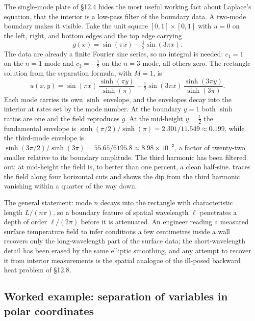 The single-mode plate of §12.4 hides the most useful working fact
about Laplace's equation, that the interior is a low-pass filter of
the boundary data. A two-mode boundary makes it visible. Take the
unit square $[0,1]\times[0,1]$ with $u = 0$ on the left, right, and
bottom edges and the top edge carrying
\[
g(x) = \sin(\pi x) - \tfrac{1}{2}\sin(3\pi x).
\]
The data are already a finite Fourier sine series, so no integral
is needed: $c_{1} = 1$ on the $n = 1$ mode and $c_{3} = -\tfrac{1}{2}$
on the $n = 3$ mode, all others zero. The rectangle solution from
the separation formula, with $M = 1$, is
\[
u(x, y) = \sin(\pi x)\, \frac{\sinh(\pi y)}{\sinh(\pi)}
        - \tfrac{1}{2}\sin(3\pi x)\, \frac{\sinh(3\pi y)}{\sinh(3\pi)}.
\]
Each mode carries its own $\sinh$ envelope, and the envelopes decay
into the interior at rates set by the mode number. At the boundary
$y = 1$ both $\sinh$ ratios are one and the field reproduces $g$. At
the mid-height $y = \tfrac{1}{2}$ the fundamental envelope is
$\sinh(\pi/2)/\sinh(\pi) = 2.301/11.549 \approx 0.199$, while the
third-mode envelope is $\sinh(3\pi/2)/\sinh(3\pi) = 55.65/6195.8
\approx 8.98 \times 10^{-3}$, a factor of twenty-two smaller
relative to its boundary amplitude. The third harmonic has been
filtered out: at mid-height the field is, to better than one
percent, a clean half-sine. 
traces the field along four horizontal cuts and shows the dip from
the third harmonic vanishing within a quarter of the way down.

The general statement: mode $n$ decays into the rectangle with
characteristic length $L/(n\pi)$, so a boundary feature of spatial
wavelength $\ell$ penetrates a depth of order $\ell/(2\pi)$ before
it is attenuated. An engineer reading a measured surface
temperature field to infer conditions a few centimetres inside a
wall recovers only the long-wavelength part of the surface data;
the short-wavelength detail has been erased by the same elliptic
smoothing, and any attempt to recover it from interior measurements
is the spatial analogue of the ill-posed backward heat problem of
§12.8.



\subsection{Worked example: separation of variables in polar coordinates}

